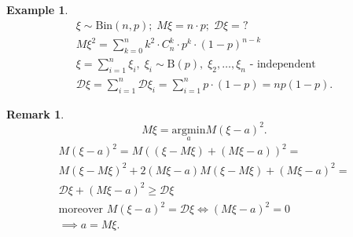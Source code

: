 \documentclass[12pt,letterpaper]{report}
\newtheorem*{example}{Example}
\newtheorem*{remark}{Remark}
\begin{document}
\begin{example}
    \begin{gather*}
        \xi \sim \text{Bin}(n,p); \; M\xi = n\cdot p;  \; \mathcal{D}\xi = ? \\
        M\xi^2 = \sum_{k=0}^{n} k^2 \cdot C_n^k \cdot p^k \cdot (1-p)^{n-k} \\
        \xi = \sum_{i=1}^{n}\xi_i, \; \xi_i \sim \text{B}(p), \; \xi_2, \dots, \xi_n \text{ - independent } \\
        \mathcal{D}\xi = \sum_{i=1}^{n} \mathcal{D}\xi_i = \sum_{i=1}^{n}p\cdot(1-p) = np(1-p).
    \end{gather*}
\end{example}

\begin{remark}
    \[
        M\xi = \underset{a}{\text{argmin}} M(\xi - a)^2
    .\] 
    \begin{gather*}
        M(\xi - a)^2 = M((\xi - M\xi) + (M\xi - a))^2 = \\
        M(\xi - M\xi)^2 + 2(M\xi -a)M(\xi-M\xi) + (M\xi-a)^2=\\
        \mathcal{D}\xi + (M\xi -a)^2 \geq \mathcal{D}\xi \\
        \text{moreover } M(\xi - a)^2 = \mathcal{D}\xi \iff (M\xi-a)^2 = 0 \\
        \implies a = M\xi.
    \end{gather*}
\end{remark}
\end{document}

